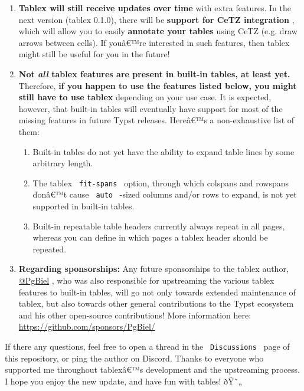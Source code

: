 \begin{enumerate}
\tightlist
\item
  \textbf{Tablex will still receive updates over time} with extra
  features. In the next version (tablex 0.1.0), there will be
  \textbf{support for CeTZ integration} , which will allow you to easily
  \textbf{annotate your tables} using CeTZ (e.g. draw arrows between
  cells). If youâ€™re interested in such features, then tablex might
  still be useful for you in the future!
\item
  \textbf{Not \emph{all} tablex features are present in built-in tables,
  at least yet.} Therefore, \textbf{if you happen to use the features
  listed below, you might still have to use tablex} depending on your
  use case. It is expected, however, that built-in tables will
  eventually have support for most of the missing features in future
  Typst releases. Hereâ€™s a non-exhaustive list of them:

  \begin{enumerate}
  \tightlist
  \item
    Built-in tables do not yet have the ability to expand table lines by
    some arbitrary length.
  \item
    The tablex \texttt{\ fit-spans\ } option, through which colspans and
    rowspans donâ€™t cause \texttt{\ auto\ } -sized columns and/or rows
    to expand, is not yet supported in built-in tables.
  \item
    Built-in repeatable table headers currently always repeat in all
    pages, whereas you can define in which pages a tablex header should
    be repeated.
  \end{enumerate}
\item
  \textbf{Regarding sponsorships:} Any future sponsorships to the tablex
  author, \href{https://github.com/PgBiel}{@PgBiel} , who was also
  responsible for upstreaming the various tablex features to built-in
  tables, will go not only towards extended maintenance of tablex, but
  also towards other general contributions to the Typst ecosystem and
  his other open-source contributions! More information here:
  \url{https://github.com/sponsors/PgBiel/}
\end{enumerate}

If there any questions, feel free to open a thread in the
\texttt{\ Discussions\ } page of this repository, or ping the author on
Discord. Thanks to everyone who supported me throughout tablexâ€™s
development and the upstreaming process. I hope you enjoy the new
update, and have fun with tables! ðŸ˜„

